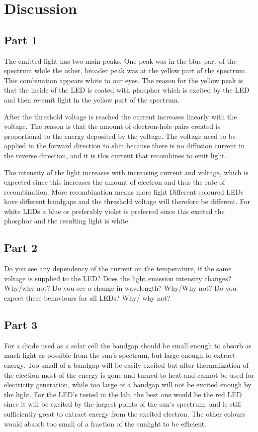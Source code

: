 \section{Discussion}
\subsection{Part 1}
The emitted light has two main peaks. One peak was in the blue part of the spectrum while the other, broader peak was at the yellow part of the spectrum. This combination appears white to our eyes. The reason for the yellow peak is that the inside of the LED is coated with phosphor which is excited by the LED and then re-emit light in the yellow part of the spectrum.

After the threshold voltage is reached the current increases linearly with the voltage. The reason is that the amount of electron-hole pairs created is proportional to the energy deposited by the voltage. The voltage need to be applied in the forward direction to shin because there is no diffusion current in the reverse direction, and it is this current that recombines to emit light.

The intensity of the light increases with increasing current and voltage, which is expected since this increases the amount of electron and thus the rate of recombination. More recombination means more light Different coloured LEDs have different bandgaps and the threshold voltage will therefore be different. For white LEDs a blue or preferably violet is preferred since this excited the phosphor and the resulting light is white.

\subsection{Part 2}
Do you see any dependency of the current on the temperature, if the same voltage is
supplied to the LED?
Does the light emission intensity changes? Why/why not?
Do you see a change in wavelength? Why/Why not?
Do you expect these behaviours for all LEDs? Why/ why not?


\subsection{Part 3}
For a diode used as a solar cell the bandgap should be small enough to absorb as much light as possible from the sun's spectrum, but large enough to extract energy. Too small of a bandgap will be easily excited but after thermalization of the election most of the energy is gone and turned to heat and cannot be used for electricity generation, while too large of a bandgap will not be excited enough by the light. For the LED's tested in the lab, the best one would be the red LED since it will be excited by the largest points of the sun's spectrum, and is still sufficiently great to extract energy from the excited electron. The other colours would absorb too small of a fraction of the sunlight to be efficient. 